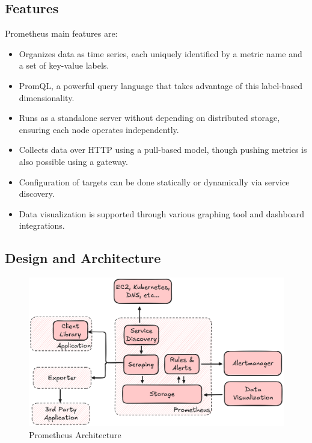 \subsection{Features}\label{subsec:features}

Prometheus main features are:

\begin{itemize}
    \item Organizes data as time series, each uniquely identified by a metric name and a set of key-value labels.
    \item PromQL, a powerful query language that takes advantage of this label-based dimensionality.
    \item Runs as a standalone server without depending on distributed storage, ensuring each node operates
    independently.
    \item Collects data over HTTP using a pull-based model, though pushing metrics is also possible using a gateway.
    \item Configuration of targets can be done statically or dynamically via service discovery.
    \item Data visualization is supported through various graphing tool and dashboard integrations.
\end{itemize}

\subsection{Design and Architecture}\label{subsec:design-and-architecture}

\begin{figure}[H]
    \centering
    \includegraphics[width=\linewidth, keepaspectratio]{./figures/prometheus_arch}
    \caption{Prometheus Architecture}
\end{figure}


